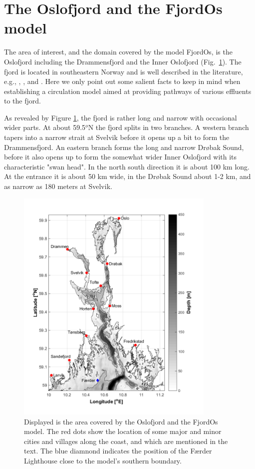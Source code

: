 \section{The Oslofjord and the FjordOs model}

The area of interest, and the domain covered by the model FjordOs, is the Oslofjord including the Drammensfjord and the Inner Oslofjord (Fig.~\ref{fig:kart}). The fjord is located in southeastern Norway and is well described in the literature, e.g., \cite{baalsrud:2002}, \cite{roed:etal:2016}, and \cite{hjelm:etal:2017}. Here we only point out some salient facts to keep in mind when establishing a circulation model aimed at providing pathways of various effluents to the fjord.

As revealed by Figure \ref{fig:kart}, the fjord is rather long and narrow with occasional wider parts. At about 59.5$^o$N the fjord splits in two branches. A western branch tapers into a narrow strait at Svelvik before it opens up a bit to form the Drammensfjord. An eastern branch forms the long and narrow Dr{\o}bak Sound, before it also opens up to form the somewhat wider Inner Oslofjord with its characteristic "swan head". In the north south direction it is about 100 km long. At the entrance it is about 50 km wide, in the Dr{\o}bak Sound about 1-2 km, and as narrow as 180 meters at Svelvik.


\begin{figure}[htb]
\centerline{
\includegraphics*[trim=0cm 0.9cm 0cm 0cm,clip=true,width=0.85\textwidth]{Figurer/kart}
}
\caption{\small
Displayed is the area covered by the Oslofjord and the FjordOs model. The red dots show the location of some major and minor cities and villages along the coast, and which are mentioned in the text. The blue diamnond indicates the position of the F{\ae}rder Lighthouse close to the model's southern boundary.
}
\label{fig:kart}
\end{figure}

